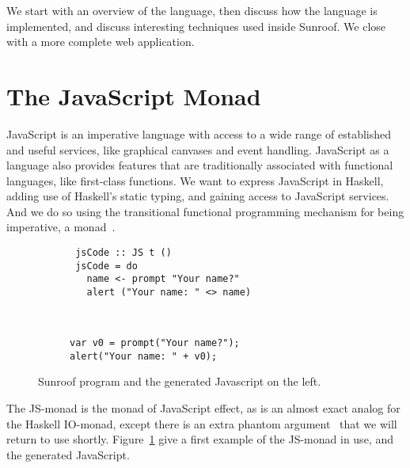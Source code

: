 \documentclass{llncs}
\begin{document}
We start with an overview of the language, then discuss
how the language is implemented, and discuss interesting
techniques used inside Sunroof. We close with a more
complete web application.

\section{The JavaScript Monad}

JavaScript is an imperative language with access to a wide range
of established and useful services, like graphical canvases and event
handling. JavaScript as a language also provides features that are
traditionally associated with functional languages, like first-class 
functions. We want to express JavaScript in Haskell, adding use
of Haskell's static typing, and gaining access to JavaScript services.
And we do so using the transitional functional programming 
mechanism for being imperative, a monad~\cite{..}.

\begin{figure}[t]
\vspace{-0.5cm}
\centering
\begin{subfigure}{0.45\textwidth}%
\begin{verbatim}
 jsCode :: JS t ()
 jsCode = do
   name <- prompt "Your name?"
   alert ("Your name: " <> name)
\end{verbatim}%
\end{subfigure}%
\hfill%
\begin{subfigure}{0.45\textwidth}
\vspace{0.25cm}%
\begin{verbatim}
  
  
var v0 = prompt("Your name?"); 
alert("Your name: " + v0);
\end{verbatim}%
\end{subfigure}%
\caption{Sunroof program and the generated Javascript on the left.}%
\label{fig:code-example}%
\end{figure}

The JS-monad is the monad of JavaScript effect, as is an almost
exact analog for the Haskell IO-monad, except there
is an extra phantom argument~\cite{..} that we will return
to use shortly.  Figure~\ref{fig:code-example} give a first example
of the JS-monad in use, and the generated JavaScript.
\end{document}
